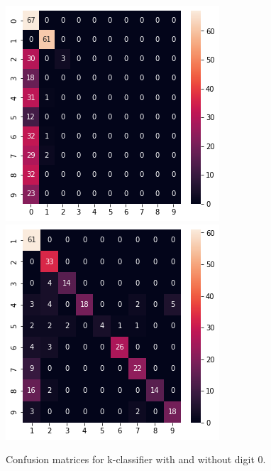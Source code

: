\documentclass[a4paper,10pt]{report}
\begin{document}
\begin{figure}[!htb]
    \includegraphics[width=\linewidth]{all_cm.png}
  \endminipage\hfill
  \includegraphics[width=\linewidth]{all_but_0_cm.png}
  \endminipage\hfill
  \caption{Confusion matrices for k-classifier with and without digit 0.}
  \label{fig:multiclass_cls_cm_k}
\end{figure}
\end{document}
